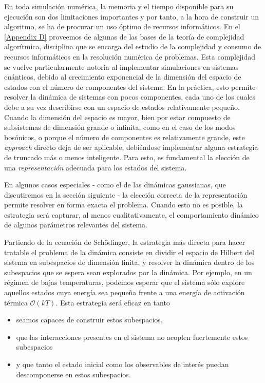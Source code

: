 \documentclass{report} %
\numberwithin{equation}{section}
\begin{document}
En toda simulación numérica, la memoria y el tiempo disponible para su ejecución son dos limitaciones importantes y por tanto, a la hora de construir un algoritmo, se ha de procurar un uso óptimo de recursos informáticos. En el \autoref{Appendix D} proveemos de algunas de las bases de la teoría de complejidad algorítmica, disciplina que se encarga del estudio de la complejidad y consumo de recursos informáticos en la resolución numérica de problemas. Esta complejidad se vuelve particularmente notoria al implementar simulaciones en sistemas cuánticos, debido al crecimiento exponencial de la dimensión del espacio de estados con el número de componentes del sistema. En la práctica, esto permite resolver la dinámica de sistemas con pocos componentes, cada uno de los cuales debe a su vez describirse con un espacio de estados relativamente pequeño.
Cuando la dimensión del espacio es mayor, bien por estar compuesto de subsistemas de dimensión grande o infinita, como en el caso de los modos bosónicos, o porque el número de componentes es relativamente grande, este \textit{approach} directo deja de ser aplicable, debiéndose implementar alguna estrategia de truncado más o menos inteligente. Para esto, es fundamental la elección de una \emph{representación} adecuada para los estados del sistema. 

En algunos casos especiales - como el de las dinámicas gaussianas, que discutiremos en la sección siguiente - la elección correcta de la representación permite resolver en forma exacta el problema.
Cuando esto no es posible, la estrategia será capturar, al menos cualitativamente, el comportamiento dinámico de algunos parámetros relevantes del sistema. 

Partiendo  de la ecuación de Sch\"odinger, la estrategia más directa para hacer tratable el problema de la dinámica consiste en dividir el espacio de Hilbert del sistema en subespacios de dimensión finita, y resolver la dinámica dentro de los subespacios que se espera sean explorados por la dinámica.
Por ejemplo, en un régimen de bajas temperaturas, podemos esperar que el sistema sólo explore aquellos estados cuya energía sea pequeña frente a una energía de activación térmica $\mathcal{O}(k T)$. Esta estrategia será eficaz en tanto 

\begin{itemize}
    \item seamos capaces de construir estos subespacios,
    \item que las interacciones presentes en el sistema no acoplen fuertemente estos subespacios
    \item y que tanto el estado inicial como los observables de interés puedan descomponerse en estos subespacios.
\end{itemize}
\end{document}
